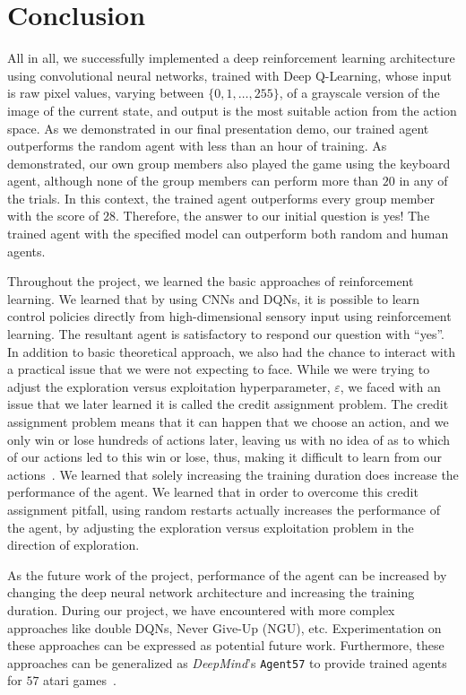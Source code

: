 \section{Conclusion}
All in all, we successfully implemented a deep reinforcement learning architecture using convolutional neural networks, trained with Deep Q-Learning, whose input is raw pixel values, varying between \( \{0, 1, \dots, 255\} \), of a grayscale version of the image of the current state, and output is the most suitable action from the action space. As we demonstrated in our final presentation demo, our trained agent outperforms the random agent with less than an hour of training. As demonstrated, our own group members also played the game using the keyboard agent, although none of the group members can perform more than \(20\) in any of the trials. In this context, the trained agent outperforms every group member with the score of \(28\). Therefore, the answer to our initial question is yes! The trained agent with the specified model can outperform both random and human agents.

Throughout the project, we learned the basic approaches of reinforcement learning. We learned that by using CNNs and DQNs, it is possible to learn control policies directly from high-dimensional sensory input using reinforcement learning. The resultant agent is satisfactory to respond our question with ``yes''. In addition to basic theoretical approach, we also had the chance to interact with a practical issue that we were not expecting to face. While we were trying to adjust the exploration versus exploitation hyperparameter, \(\varepsilon \), we faced with an issue that we later learned it is called the credit assignment problem. The credit assignment problem means that it can happen that we choose an action, and we only win or lose hundreds of actions later, leaving us with no idea of as to which of our actions led to this win or lose, thus, making it difficult to learn from our actions~\autocite{mnih2013playing}. We learned that solely increasing the training duration does increase the performance of the agent. We learned that in order to overcome this credit assignment pitfall, using random restarts actually increases the performance of the agent, by adjusting the exploration versus exploitation problem in the direction of exploration.

As the future work of the project, performance of the agent can be increased by changing the deep neural network architecture and increasing the training duration. During our project, we have encountered with more complex approaches like double DQNs, Never Give-Up (NGU), etc. Experimentation on these approaches can be expressed as potential future work. Furthermore, these approaches can be generalized as \textit{DeepMind}'s \texttt{Agent57} to provide trained agents for \(57\) atari games~\autocite{agent57}.
